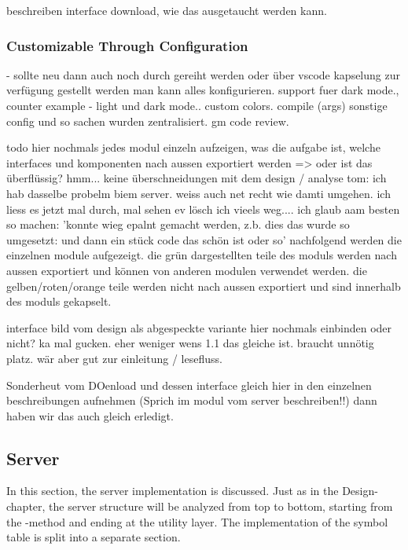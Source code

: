 beschreiben interface download, wie das ausgetaucht werden kann.

\subsubsection{Customizable Through Configuration}
  - sollte neu dann auch noch durch gereiht werden oder über vscode kapselung zur verfügung gestellt werden
man kann alles konfigurieren. support fuer dark mode.,
counter example  - light und dark mode.. custom colors.
compile (args)
sonstige config und so sachen wurden zentralisiert. gm code review.



todo hier nochmals jedes modul einzeln aufzeigen, was die aufgabe ist, welche interfaces und komponenten nach aussen exportiert werden
=> oder ist das überflüssig? hmm... keine überschneidungen mit dem design / analyse
tom: ich hab dasselbe probelm biem server. weiss auch net recht wie damti umgehen. ich liess es jetzt mal durch, mal sehen ev lösch ich vieels weg.... 
ich glaub aam besten so machen: 'konnte wieg epalnt gemacht werden, z.b. dies das wurde so umgesetzt: und dann ein stück code das schön ist oder so'
nachfolgend werden die einzelnen module aufgezeigt.
die grün dargestellten teile des moduls werden nach aussen exportiert und können von anderen modulen verwendet werden.
die gelben/roten/orange teile werden nicht nach aussen exportiert und sind innerhalb des moduls gekapselt.

interface bild vom design als abgespeckte variante hier nochmals einbinden oder nicht? ka mal gucken. eher weniger wens 1.1 das gleiche ist. braucht unnötig platz. wär aber gut zur einleitung / lesefluss.

Sonderheut vom DOenload und dessen interface gleich hier in den einzelnen beschreibungen aufnehmen (Sprich im modul vom server beschreiben!!) dann haben wir das auch gleich erledigt.



\subsection{Server}
In this section, the server implementation is discussed.
Just as in the Design-chapter, the server structure will be analyzed from top to bottom, starting from the -method and ending at the utility layer.
The implementation of the symbol table is split into a separate section.

